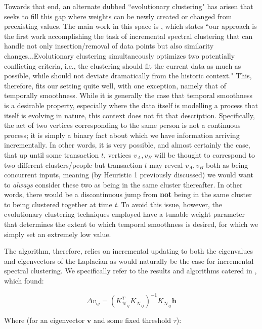 \documentclass{article}
\begin{document}
Towards that end, an alternate dubbed ``evolutionary clustering" has arisen that seeks to fill this gap where weights can be newly created or changed from preexisting values. The main work in this space is \cite{incremental}, which states ``our approach is the first work accomplishing the task of incremental spectral clustering that can handle not only insertion/removal of data points but also similarity changes...Evolutionary clustering simultaneously optimizes two potentially conflicting criteria, i.e., the clustering should fit the current data as much as possible, while should not deviate dramatically from the historic context." This, therefore, fits our setting quite well, with one exception, namely that of temporally smoothness. While it is generally the case that temporal smoothness is a desirable property, especially where the data itself is modelling a process that itself is evolving in nature, this context does not fit that description. Specifically, the act of two vertices corresponding to the same person is not a continuous process; it is simply a binary fact about which we have information arriving incrementally. In other words, it is very possible, and almost certainly the case, that up until some transaction $t$, vertices $v_A,v_B$ will be thought to correspond to two different clusters/people but transaction $t$ may reveal $v_A,v_B$ both as being concurrent inputs, meaning (by Heuristic 1 previously discussed) we would want to \textit{always} consider these two as being in the same cluster thereafter. In other words, there would be a discontinuous jump from \textbf{not} being in the same cluster to being clustered together at time \textit{t}. To avoid this issue, however, the evolutionary clustering techniques employed have a tunable weight parameter that determines the extent to which temporal smoothness is desired, for which we simply set an extremely low value.

The algorithm, therefore, relies on incremental updating to both the eigenvalues and eigenvectors of the Laplacian as would naturally be the case for incremental spectral clustering. We specifically refer to the results and algorithms catered in \cite{incremental}, which found:

\begin{equation}
    \Delta v_{ij} = (K^T_{\mathcal{N}_{ij}} K_{\mathcal{N}_{ij}})^{-1} K_{\mathcal{N}_{ij}} \textbf{h}\label{eq:delta-v}
\end{equation}

Where (for an eigenvector $\textbf{v}$ and some fixed threshold $\tau$):
\end{document}
